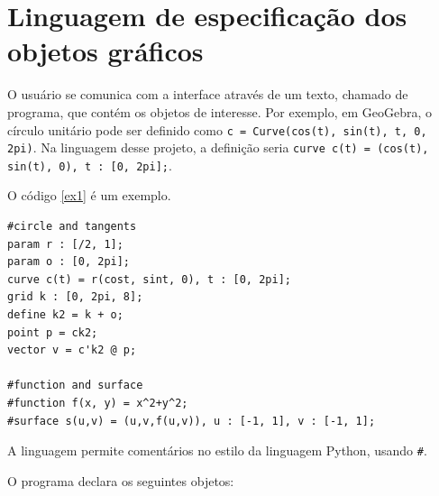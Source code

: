 \chapter{Linguagem de especificação dos objetos gráficos}
\label{lang}

O usuário se comunica com a interface através de um texto, chamado de programa,
que contém os objetos de interesse. 
Por exemplo, em GeoGebra, o círculo unitário pode ser
definido como
\texttt{c = Curve(cos(t), sin(t), t, 0, 2pi)}.
Na linguagem desse projeto, a definição seria
\texttt{curve c(t) = (cos(t), sin(t), 0), t : [0, 2pi];}.

O código \ref{ex1} é um exemplo.
\begin{lstlisting}[caption=Exemplo de objetos,label=ex1]
#circle and tangents
param r : [/2, 1];
param o : [0, 2pi];
curve c(t) = r(cost, sint, 0), t : [0, 2pi];
grid k : [0, 2pi, 8];
define k2 = k + o;
point p = ck2;
vector v = c'k2 @ p;

#function and surface
#function f(x, y) = x^2+y^2;
#surface s(u,v) = (u,v,f(u,v)), u : [-1, 1], v : [-1, 1];
\end{lstlisting}

A linguagem permite comentários no estilo da linguagem Python, usando \texttt{\#}.

O programa declara os seguintes objetos:

